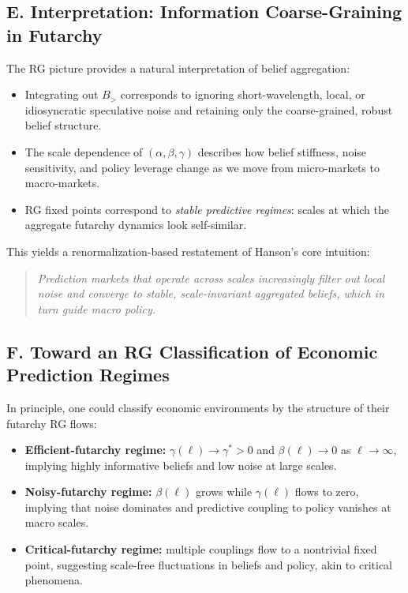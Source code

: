 \documentclass[12pt]{article}
\begin{document}
\subsection*{E. Interpretation: Information Coarse-Graining in Futarchy}

The RG picture provides a natural interpretation of belief aggregation:

\begin{itemize}
    \item Integrating out $B_{>}$ corresponds to ignoring short-wavelength,
    local, or idiosyncratic speculative noise and retaining only the
    coarse-grained, robust belief structure.
    \item The scale dependence of $(\alpha,\beta,\gamma)$ describes how
    belief stiffness, noise sensitivity, and policy leverage change as we 
    move from micro-markets to macro-markets.
    \item RG fixed points correspond to \emph{stable predictive regimes}:
    scales at which the aggregate futarchy dynamics look self-similar.
\end{itemize}

This yields a renormalization-based restatement of Hanson’s core
intuition:
\begin{quote}
\emph{Prediction markets that operate across scales increasingly 
filter out local noise and converge to stable, scale-invariant
aggregated beliefs, which in turn guide macro policy.}
\end{quote}

\subsection*{F. Toward an RG Classification of Economic Prediction Regimes}

In principle, one could classify economic environments by the structure
of their futarchy RG flows:
\begin{itemize}
    \item \textbf{Efficient-futarchy regime:} $\gamma(\ell)\to\gamma^\ast>0$
    and $\beta(\ell)\to0$ as $\ell\to\infty$, implying highly informative
    beliefs and low noise at large scales.
    \item \textbf{Noisy-futarchy regime:} $\beta(\ell)$ grows while
    $\gamma(\ell)$ flows to zero, implying that noise dominates and
    predictive coupling to policy vanishes at macro scales.
    \item \textbf{Critical-futarchy regime:} multiple couplings flow to
    a nontrivial fixed point, suggesting scale-free fluctuations in
    beliefs and policy, akin to critical phenomena.
\end{itemize}
\end{document}
